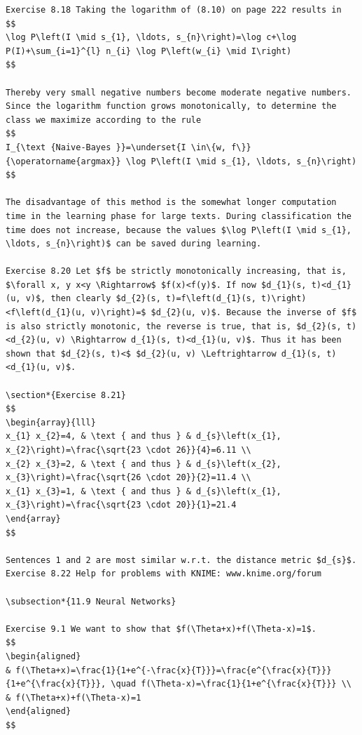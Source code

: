 \documentclass[10pt]{book}
\begin{document}
\begin{center}
\begin{enumerate}
\begin{center}
\begin{center}
\begin{center}
\begin{center}
\begin{center}
\begin{verbatim}
Exercise 8.18 Taking the logarithm of (8.10) on page 222 results in
$$
\log P\left(I \mid s_{1}, \ldots, s_{n}\right)=\log c+\log P(I)+\sum_{i=1}^{l} n_{i} \log P\left(w_{i} \mid I\right)
$$

Thereby very small negative numbers become moderate negative numbers. Since the logarithm function grows monotonically, to determine the class we maximize according to the rule
$$
I_{\text {Naive-Bayes }}=\underset{I \in\{w, f\}}{\operatorname{argmax}} \log P\left(I \mid s_{1}, \ldots, s_{n}\right)
$$

The disadvantage of this method is the somewhat longer computation time in the learning phase for large texts. During classification the time does not increase, because the values $\log P\left(I \mid s_{1}, \ldots, s_{n}\right)$ can be saved during learning.

Exercise 8.20 Let $f$ be strictly monotonically increasing, that is, $\forall x, y x<y \Rightarrow$ $f(x)<f(y)$. If now $d_{1}(s, t)<d_{1}(u, v)$, then clearly $d_{2}(s, t)=f\left(d_{1}(s, t)\right)<f\left(d_{1}(u, v)\right)=$ $d_{2}(u, v)$. Because the inverse of $f$ is also strictly monotonic, the reverse is true, that is, $d_{2}(s, t)<d_{2}(u, v) \Rightarrow d_{1}(s, t)<d_{1}(u, v)$. Thus it has been shown that $d_{2}(s, t)<$ $d_{2}(u, v) \Leftrightarrow d_{1}(s, t)<d_{1}(u, v)$.

\section*{Exercise 8.21}
$$
\begin{array}{lll}
x_{1} x_{2}=4, & \text { and thus } & d_{s}\left(x_{1}, x_{2}\right)=\frac{\sqrt{23 \cdot 26}}{4}=6.11 \\
x_{2} x_{3}=2, & \text { and thus } & d_{s}\left(x_{2}, x_{3}\right)=\frac{\sqrt{26 \cdot 20}}{2}=11.4 \\
x_{1} x_{3}=1, & \text { and thus } & d_{s}\left(x_{1}, x_{3}\right)=\frac{\sqrt{23 \cdot 20}}{1}=21.4
\end{array}
$$

Sentences 1 and 2 are most similar w.r.t. the distance metric $d_{s}$.
Exercise 8.22 Help for problems with KNIME: www.knime.org/forum

\subsection*{11.9 Neural Networks}

Exercise 9.1 We want to show that $f(\Theta+x)+f(\Theta-x)=1$.
$$
\begin{aligned}
& f(\Theta+x)=\frac{1}{1+e^{-\frac{x}{T}}}=\frac{e^{\frac{x}{T}}}{1+e^{\frac{x}{T}}}, \quad f(\Theta-x)=\frac{1}{1+e^{\frac{x}{T}}} \\
& f(\Theta+x)+f(\Theta-x)=1
\end{aligned}
$$


\end{verbatim}
\end{center}
\end{center}
\end{center}
\end{center}
\end{center}
\end{enumerate}
\end{center}
\end{document}

